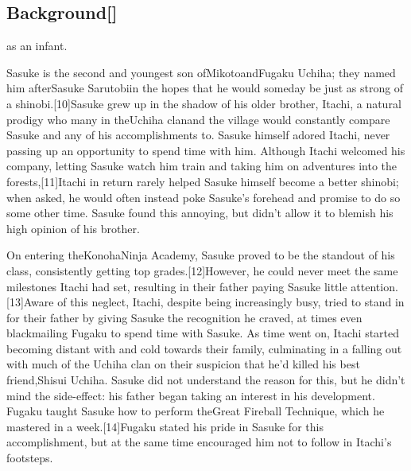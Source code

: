 \documentclass[a4paper,12pt]{article}
\begin{document}
\subsection*{Background[]}\n\nSasuke as an infant.\\ \par \vspace{0.5cm}

Sasuke is the second and youngest son ofMikotoandFugaku Uchiha; they named him afterSasuke Sarutobiin the hopes that he would someday be just as strong of a shinobi.[10]Sasuke grew up in the shadow of his older brother, Itachi, a natural prodigy who many in theUchiha clanand the village would constantly compare Sasuke and any of his accomplishments to. Sasuke himself adored Itachi, never passing up an opportunity to spend time with him. Although Itachi welcomed his company, letting Sasuke watch him train and taking him on adventures into the forests,[11]Itachi in return rarely helped Sasuke himself become a better shinobi; when asked, he would often instead poke Sasuke's forehead and promise to do so some other time. Sasuke found this annoying, but didn't allow it to blemish his high opinion of his brother.\\ \par \vspace{0.5cm}

On entering theKonohaNinja Academy, Sasuke proved to be the standout of his class, consistently getting top grades.[12]However, he could never meet the same milestones Itachi had set, resulting in their father paying Sasuke little attention.[13]Aware of this neglect, Itachi, despite being increasingly busy, tried to stand in for their father by giving Sasuke the recognition he craved, at times even blackmailing Fugaku to spend time with Sasuke. As time went on, Itachi started becoming distant with and cold towards their family, culminating in a falling out with much of the Uchiha clan on their suspicion that he'd killed his best friend,Shisui Uchiha. Sasuke did not understand the reason for this, but he didn't mind the side-effect: his father began taking an interest in his development. Fugaku taught Sasuke how to perform theGreat Fireball Technique, which he mastered in a week.[14]Fugaku stated his pride in Sasuke for this accomplishment, but at the same time encouraged him not to follow in Itachi's footsteps.\\ \par \vspace{0.5cm}
\end{document}
